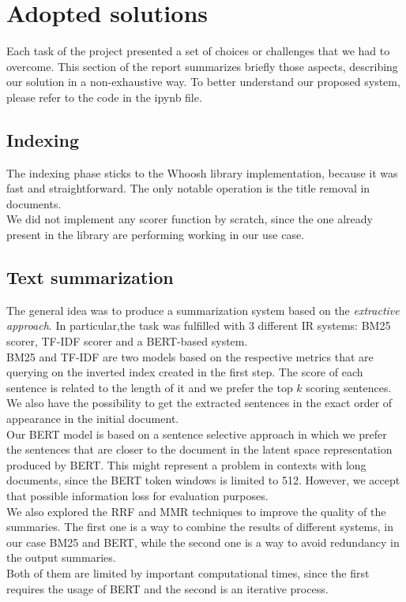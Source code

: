 \section{Adopted solutions}
Each task of the project presented a set of choices or challenges that we had to overcome. This section of the report summarizes briefly those aspects, describing our solution in a non-exhaustive way. To better understand our proposed system, please refer to the code in the ipynb file.

\subsection{Indexing}
The indexing phase sticks to the Whoosh library implementation, because it was fast and straightforward. The only notable operation is the title removal in documents.\\
We did not implement any scorer function by scratch, since the one already present in the library are performing working in our use case.  
\subsection{Text summarization}
The general idea was to produce a summarization system based on the \emph{extractive approach}. In particular,the task was fulfilled with 3 different IR systems: BM25 scorer, TF-IDF scorer and a BERT-based system.\\
BM25 and TF-IDF are two models based on the respective metrics that are querying on the inverted index created in the first step. The score of each sentence is related to the length of it and we prefer the top $k$ scoring sentences. We also have the possibility to get the extracted sentences in the exact order of appearance in the initial document.\\ Our BERT model is based on a sentence selective approach in which we prefer the sentences that are closer to the document in the latent space representation produced by BERT. This might represent a problem in contexts with long documents, since the BERT token windows is limited to 512. However, we accept that possible information loss for evaluation purposes.\\
We also explored the RRF and MMR techniques to improve the quality of the summaries. The first one is a way to combine the results of different systems, in our case BM25 and BERT, while the second one is a way to avoid redundancy in the output summaries.\\ Both of them are limited by important computational times, since the first requires the usage of BERT and the second is an iterative process.

